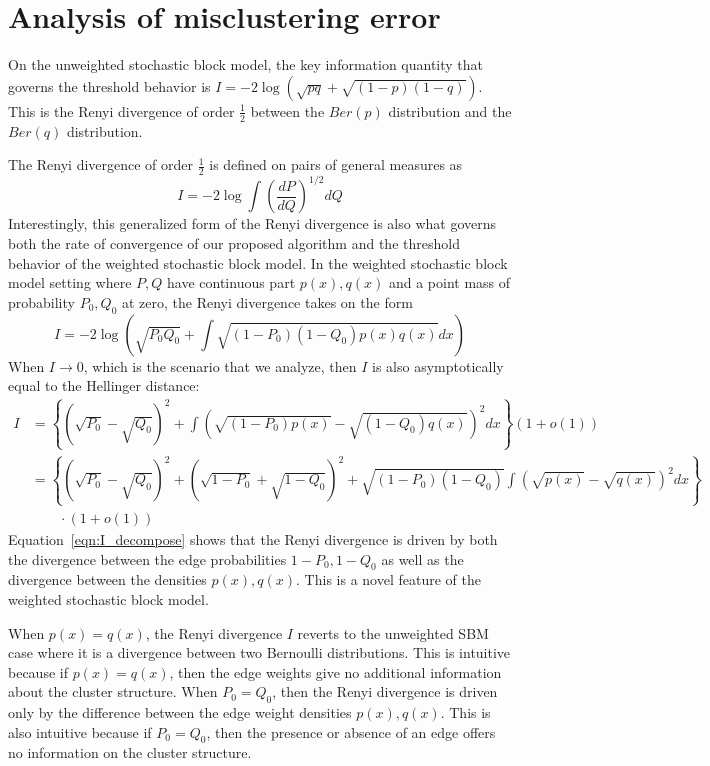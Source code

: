 \section{Analysis of misclustering error}
\label{sec:rate}

On the unweighted stochastic block model, the key information quantity that governs the threshold behavior is $I = -2 \log (\sqrt{p q} + \sqrt{(1-p)(1-q)})$. This is the Renyi divergence of order $\frac{1}{2}$ between the $Ber(p)$ distribution and the $Ber(q)$ distribution. 

The Renyi divergence of order $\frac{1}{2}$ is defined on pairs of general measures as 
\[
I = -2 \log \int \left( \frac{dP}{dQ} \right)^{1/2} dQ
\]
Interestingly, this generalized form of the Renyi divergence is also what governs both the rate of convergence of our proposed algorithm and the threshold behavior of the weighted stochastic block model. In the weighted stochastic block model setting where $P, Q$ have continuous part $p(x), q(x)$ and a point mass of probability $P_0, Q_0$ at zero, the Renyi divergence takes on the form
\[
I = -2 \log \left( \sqrt{P_0 Q_0} + \int \sqrt{(1-P_0)(1-Q_0)p(x) q(x)} dx \right)
\]
When $I \rightarrow 0$, which is the scenario that we analyze, then $I$ is also asymptotically equal to the Hellinger distance:
\begin{align}
I &= \left\{ (\sqrt{P_0} - \sqrt{Q_0})^2 + \int (\sqrt{(1-P_0)p(x)} - \sqrt{(1-Q_0)q(x)} )^2 dx \right\} (1 + o(1)) \nonumber \\ 
 &= \left\{ (\sqrt{P_0} - \sqrt{Q_0})^2 + (\sqrt{1-P_0} + \sqrt{1-Q_0})^2 + 
             \sqrt{(1-P_0)(1-Q_0)} \int (\sqrt{p(x)} - \sqrt{q(x)} )^2 dx \right\} \nonumber \\
             & \qquad \cdot (1 + o(1)) \label{eqn:I_decompose} 
\end{align}
Equation~\ref{eqn:I_decompose} shows that the Renyi divergence is driven by both the divergence between the edge probabilities $1-P_0, 1-Q_0$ as well as the divergence between the densities $p(x), q(x)$. This is a novel feature of the weighted stochastic block model. 


When $p(x) = q(x)$, the Renyi divergence $I$ reverts to the unweighted SBM case where it is a divergence between two Bernoulli distributions. This is intuitive because if $p(x) = q(x)$, then the edge weights give no additional information about the cluster structure. When $P_0 = Q_0$, then the Renyi divergence is driven only by the difference between the edge weight densities $p(x), q(x)$. This is also intuitive because if $P_0 = Q_0$, then the presence or absence of an edge offers no information on the cluster structure. 


